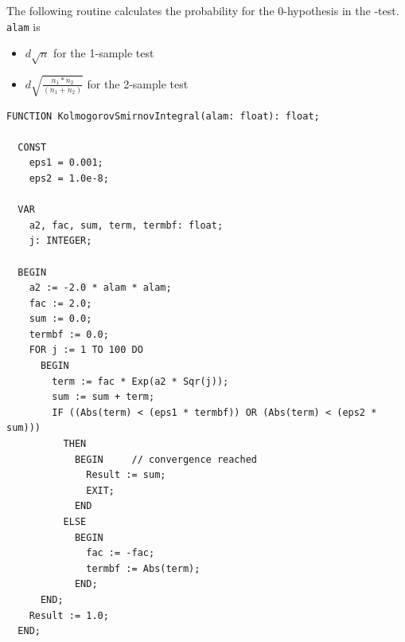 \begin{refsection}
The following routine calculates the probability for the 0-hypothesis in the -test. \texttt{alam} is
\begin{itemize}
  \item{\( d \sqrt{n} \) for the 1-sample test}
  \item{\( d \sqrt{\frac{n_1*n_2}{(n_1+n_2)}} \) for the 2-sample test}
\end{itemize}

\begin{lstlisting}[caption=\Name{Kolmogorov-Smirnov}-test]
  FUNCTION KolmogorovSmirnovIntegral(alam: float): float;

  CONST
    eps1 = 0.001;
    eps2 = 1.0e-8;

  VAR
    a2, fac, sum, term, termbf: float;
    j: INTEGER;

  BEGIN
    a2 := -2.0 * alam * alam;
    fac := 2.0;
    sum := 0.0;
    termbf := 0.0;
    FOR j := 1 TO 100 DO
      BEGIN
        term := fac * Exp(a2 * Sqr(j));
        sum := sum + term;
        IF ((Abs(term) < (eps1 * termbf)) OR (Abs(term) < (eps2 * sum)))
          THEN
            BEGIN     // convergence reached
              Result := sum;
              EXIT;
            END
          ELSE
            BEGIN
              fac := -fac;
              termbf := Abs(term);
            END;
      END;
    Result := 1.0;
  END;
\end{lstlisting}

\printbibliography[heading=subbibliography]
\end{refsection}

